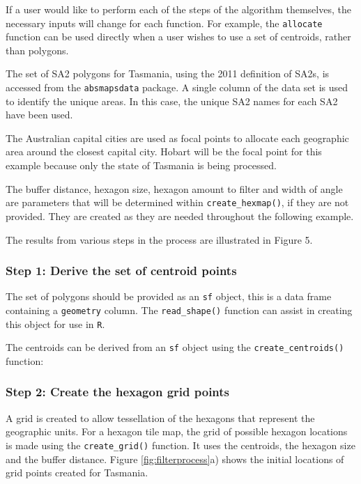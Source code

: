 If a user would like to perform each of the steps of the algorithm
themselves, the necessary inputs will change for each function. For
example, the \texttt{allocate} function can be used directly when a user
wishes to use a set of centroids, rather than polygons.

The set of SA2 polygons for Tasmania, using the 2011 definition of SA2s,
is accessed from the \texttt{absmapsdata} package. A single column of
the data set is used to identify the unique areas. In this case, the
unique SA2 names for each SA2 have been used.

The Australian capital cities are used as focal points to allocate each
geographic area around the closest capital city. Hobart will be the
focal point for this example because only the state of Tasmania is being
processed.

The buffer distance, hexagon size, hexagon amount to filter and width of
angle are parameters that will be determined within
\texttt{create\_hexmap()}, if they are not provided. They are created as
they are needed throughout the following example.

The results from various steps in the process are illustrated in Figure
5.

\hypertarget{step-1-derive-the-set-of-centroid-points}{%
\subsubsection{Step 1: Derive the set of centroid
points}\label{step-1-derive-the-set-of-centroid-points}}

The set of polygons should be provided as an \texttt{sf} object, this is
a data frame containing a \texttt{geometry} column. The
\texttt{read\_shape()} function can assist in creating this object for
use in \texttt{R}.

The centroids can be derived from an \texttt{sf} object using the
\texttt{create\_centroids()} function:

\hypertarget{step-2-create-the-hexagon-grid-points}{%
\subsubsection{Step 2: Create the hexagon grid
points}\label{step-2-create-the-hexagon-grid-points}}

A grid is created to allow tessellation of the hexagons that represent
the geographic units. For a hexagon tile map, the grid of possible
hexagon locations is made using the \texttt{create\_grid()} function. It
uses the centroids, the hexagon size and the buffer distance. Figure
\ref{fig:filterprocess}a) shows the initial locations of grid points
created for Tasmania.

